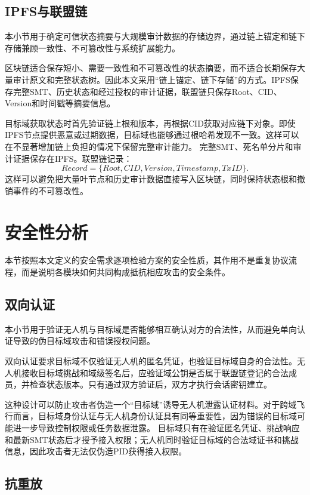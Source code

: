 \documentclass[conference]{IEEEtran}
\begin{document}
	\subsection{IPFS与联盟链}
	
	本小节用于确定可信状态摘要与大规模审计数据的存储边界，通过链上锚定和链下存储兼顾一致性、不可篡改性与系统扩展能力。
	
	区块链适合保存短小、需要一致性和不可篡改性的状态摘要，而不适合长期保存大量审计原文和完整状态树。因此本文采用“链上锚定、链下存储”的方式。IPFS保存完整SMT、历史状态和经过授权的审计证据，联盟链只保存Root、CID、Version和时间戳等摘要信息。
	
	目标域获取状态时首先验证链上根和版本，再根据CID获取对应链下对象。即使IPFS节点提供恶意或过期数据，目标域也能够通过根哈希发现不一致。这样可以在不显著增加链上负担的情况下保留完整审计能力。
	完整SMT、死名单分片和审计证据保存在IPFS。联盟链记录：
	\begin{equation}
		Record=\{Root,CID,Version,Timestamp,TxID\}.
	\end{equation}
	这样可以避免把大量叶节点和历史审计数据直接写入区块链，同时保持状态根和撤销事件的不可篡改性。
	
	\section{安全性分析}
	
	本节按照本文定义的安全需求逐项检验方案的安全性质，其作用不是重复协议流程，而是说明各模块如何共同构成抵抗相应攻击的安全条件。
	
	
	\subsection{双向认证}
	
	本小节用于验证无人机与目标域是否能够相互确认对方的合法性，从而避免单向认证导致的伪目标域攻击和错误授权问题。
	
	双向认证要求目标域不仅验证无人机的匿名凭证，也验证目标域自身的合法性。无人机接收目标域挑战和域级签名后，应验证域公钥是否属于联盟链登记的合法成员，并检查状态版本。只有通过双方验证后，双方才执行会话密钥建立。
	
	这种设计可以防止攻击者伪造一个“目标域”诱导无人机泄露认证材料。对于跨域飞行而言，目标域身份认证与无人机身份认证具有同等重要性，因为错误的目标域可能进一步导致控制权限或任务数据泄露。
	目标域只有在验证匿名凭证、挑战响应和最新SMT状态后才授予接入权限；无人机同时验证目标域的合法域证书和挑战信息，因此攻击者无法仅伪造PID获得接入权限。
	
	\subsection{抗重放}
	
\end{document}
